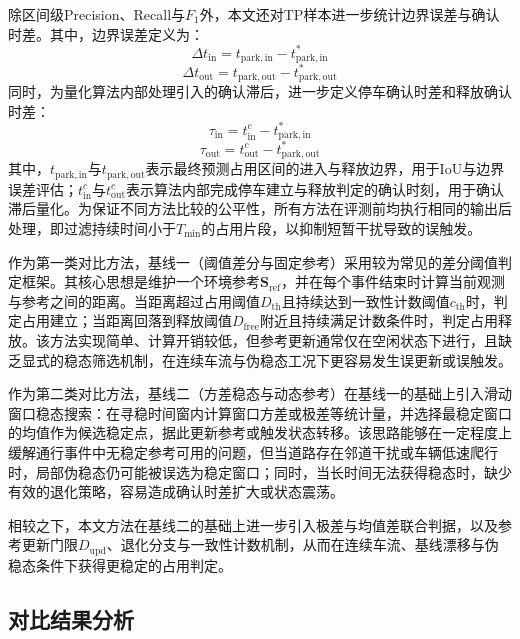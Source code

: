 \documentclass{xdupgthesis}
\begin{document}
除区间级Precision、Recall与$F_1$外，本文还对TP样本进一步统计边界误差与确认时差。其中，边界误差定义为：
\begin{equation}
    \Delta t_{\mathrm{in}}=t_{\mathrm{park,in}}-t^{*}_{\mathrm{park,in}}
\end{equation}
\begin{equation}
    \Delta t_{\mathrm{out}}=t_{\mathrm{park,out}}-t^{*}_{\mathrm{park,out}}
\end{equation}
同时，为量化算法内部处理引入的确认滞后，进一步定义停车确认时差和释放确认时差：
\begin{equation}
    \tau_{\mathrm{in}}=t^{c}_{\mathrm{in}}-t^{*}_{\mathrm{park,in}}
\end{equation}
\begin{equation}
    \tau_{\mathrm{out}}=t^{c}_{\mathrm{out}}-t^{*}_{\mathrm{park,out}}
\end{equation}
其中，$t_{\mathrm{park,in}}$与$t_{\mathrm{park,out}}$表示最终预测占用区间的进入与释放边界，用于IoU与边界误差评估；$t^{c}_{\mathrm{in}}$与$t^{c}_{\mathrm{out}}$表示算法内部完成停车建立与释放判定的确认时刻，用于确认滞后量化。为保证不同方法比较的公平性，所有方法在评测前均执行相同的输出后处理，即过滤持续时间小于$T_{\min}$的占用片段，以抑制短暂干扰导致的误触发。



作为第一类对比方法，基线一（阈值差分与固定参考）采用较为常见的差分阈值判定框架。其核心思想是维护一个环境参考$\mathbf{S}_{\mathrm{ref}}$，并在每个事件结束时计算当前观测与参考之间的距离。当距离超过占用阈值$D_{\mathrm{th}}$且持续达到一致性计数阈值$c_{\mathrm{th}}$时，判定占用建立；当距离回落到释放阈值$D_{\mathrm{free}}$附近且持续满足计数条件时，判定占用释放。该方法实现简单、计算开销较低，但参考更新通常仅在空闲状态下进行，且缺乏显式的稳态筛选机制，在连续车流与伪稳态工况下更容易发生误更新或误触发。

作为第二类对比方法，基线二（方差稳态与动态参考）在基线一的基础上引入滑动窗口稳态搜索：在寻稳时间窗内计算窗口方差或极差等统计量，并选择最稳定窗口的均值作为候选稳定点，据此更新参考或触发状态转移。该思路能够在一定程度上缓解通行事件中无稳定参考可用的问题，但当道路存在邻道干扰或车辆低速爬行时，局部伪稳态仍可能被误选为稳定窗口；同时，当长时间无法获得稳态时，缺少有效的退化策略，容易造成确认时差扩大或状态震荡。

相较之下，本文方法在基线二的基础上进一步引入极差与均值差联合判据，以及参考更新门限$D_{\mathrm{upd}}$、退化分支与一致性计数机制，从而在连续车流、基线漂移与伪稳态条件下获得更稳定的占用判定。

\subsection{对比结果分析}
\label{subsec:ch4_results}
\end{document}
